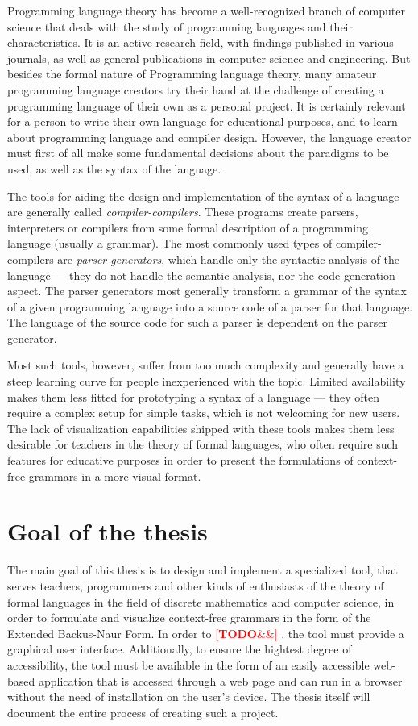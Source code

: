 \documentclass[english,engineering]{wizthesis}
\newcommand{\todo}[1]{%
  \textcolor{red}{[\textbf{TODO}\ifx&#1&{}\else{ }\fi\emph{#1}]}%
}
\begin{document}
Programming language theory has become a well-recognized branch of computer
science that deals with the study of programming languages and their
characteristics. It is an active research field, with findings published in
various journals, as well as general publications in computer science and
engineering. But besides the formal nature of Programming language theory, many
amateur programming language creators try their hand at the challenge of
creating a programming language of their own as a personal project. It is
certainly relevant for a person to write their own language for educational
purposes, and to learn about programming language and compiler design. However,
the language creator must first of all make some fundamental decisions about the
paradigms to be used, as well as the syntax of the language.

The tools for aiding the design and implementation of the syntax of a language
are generally called \emph{compiler-compilers}. These programs create parsers,
interpreters or compilers from some formal description of a programming
language (usually a grammar). The most commonly used types of
compiler-compilers are \emph{parser generators}, which handle only the
syntactic analysis of the language --- they do not handle the semantic analysis,
nor the code generation aspect. The parser generators most generally transform a
grammar of the syntax of a given programming language into a source code of a
parser for that language. The language of the source code for such a parser is
dependent on the parser generator.

Most such tools, however, suffer from too much complexity and generally have a
steep learning curve for people inexperienced with the topic. Limited
availability makes them less fitted for prototyping a syntax of a language ---
they often require a complex setup for simple tasks, which is not welcoming for
new users. The lack of visualization capabilities shipped with these tools makes
them less desirable for teachers in the theory of formal languages, who often
require such features for educative purposes in order to present the
formulations of context-free grammars in a more visual format.

\section{Goal of the thesis}

The main goal of this thesis is to design and implement a specialized tool, that
serves teachers, programmers and other kinds of enthusiasts of the theory of
formal languages in the field of discrete mathematics and computer science, in
order to formulate and visualize context-free grammars in the form of the
Extended Backus-Naur Form. In order to \todo{}, the tool must provide a
graphical user interface. Additionally, to ensure the hightest degree of
accessibility, the tool must be available in the form of an easily accessible
web-based application that is accessed through a web page and can run in a
browser without the need of installation on the user's device. The thesis itself
will document the entire process of creating such a project.
\end{document}
